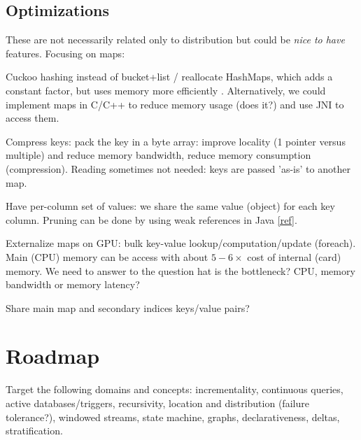 \documentclass[10pt]{article}
\begin{document}
\subsection{Optimizations}
These are not necessarily related only to distribution but could be \textit{nice to have} features. Focusing on maps:
\ol
\item Cuckoo hashing instead of bucket+list / reallocate HashMaps, which adds a constant factor, but uses memory more efficiently \cite{gpu_hashing}. Alternatively, we could implement maps in C/C++ to reduce memory usage (does it?) and use JNI to access them.
\item Compress keys: pack the key in a byte array: improve locality (1 pointer versus multiple) and reduce memory bandwidth, reduce memory consumption (compression). Reading sometimes not needed: keys are passed 'as-is' to another map.
\item Have per-column set of values: we share the same value (object) for each key column. Pruning can be done by using weak references in Java \href{http://stackoverflow.com/questions/4062919/why-does-exist-weakhashmap-but-absent-weakset}{[ref]}.
\item Externalize maps on GPU: bulk key-value lookup/computation/update (foreach). Main (CPU) memory can be access with about $5-6\times $ cost of internal (card) memory. We need to answer to the question hat is the bottleneck? CPU, memory bandwidth or memory latency?
\item Share main map and secondary indices keys/value pairs?
\ole

\section{Roadmap}
Target the following domains and concepts: incrementality, continuous queries, active databases/triggers, recursivity, location and distribution (failure tolerance?), windowed streams, state machine, graphs, declarativeness, deltas, stratification.
\end{document}
